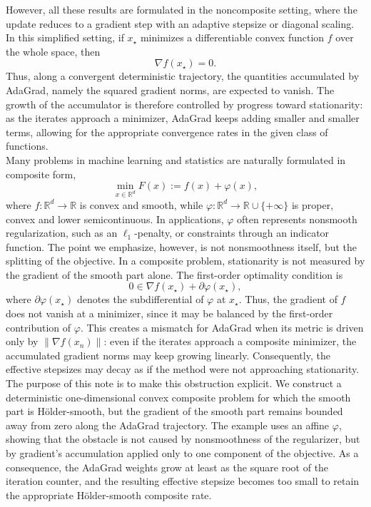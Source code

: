 \documentclass[11pt]{article}
\newcommand{\R}{\mathbb{R}}
\begin{document}
\noindent
However, all these results are formulated in the noncomposite setting, where the update reduces to a gradient step with an adaptive stepsize or diagonal scaling.
In this simplified setting, if \(x_\star\) minimizes a differentiable convex function \(f\) over the whole space, then
\[
\nabla f(x_\star)=0.
\]
Thus, along a convergent deterministic trajectory, the quantities accumulated by AdaGrad, namely the squared gradient norms, are expected to vanish. The growth of the accumulator is therefore controlled by progress toward stationarity: as the iterates approach a minimizer, AdaGrad keeps adding smaller and smaller terms, allowing for the appropriate convergence rates in the given class of functions.  \\

\noindent
Many problems in machine learning and statistics are naturally formulated in composite form,
\begin{equation}
    \min_{x\in\R^d} F(x) := f(x)+\varphi(x),
\label{eq:composite-problem}
\end{equation}
where \(f\colon\R^d\to\R\) is convex and smooth, while \(\varphi\colon\R^d\to\R\cup\{+\infty\}\) is proper, convex and lower semicontinuous. In applications, \(\varphi\) often represents nonsmooth regularization, such as an \(\ell_1\)-penalty, or constraints through an indicator function. The point we emphasize, however, is not nonsmoothness itself, but the splitting of the objective. In a composite problem, stationarity is not measured by the gradient of the smooth part alone. The first-order optimality condition is
\[
0\in \nabla f(x_\star)+\partial\varphi(x_\star),
\]
where \(\partial\varphi(x_\star)\) denotes the subdifferential of \(\varphi\) at \(x_\star\). Thus, the gradient of $f$ does not vanish at a minimizer, since it may be balanced by the first-order contribution of \(\varphi\). This creates a mismatch for AdaGrad when its metric is driven only by \(\lVert\nabla f(x_n)\rVert\): even if the iterates approach a composite minimizer, the accumulated gradient norms may keep growing linearly. Consequently, the effective stepsizes may decay as if the method were not approaching stationarity. \\

\noindent
The purpose of this note is to make this obstruction explicit. We construct a deterministic one-dimensional convex composite problem for which the smooth part is H\"older-smooth, but the gradient of the smooth part remains bounded away from zero along the AdaGrad trajectory. The example uses an affine \(\varphi\), showing that the obstacle is not caused by nonsmoothness of the regularizer, but by gradient's accumulation applied only to one component of the objective. As a consequence, the AdaGrad weights grow at least as the square root of the iteration counter, and the resulting effective stepsize becomes too small to retain the appropriate H\"older-smooth composite rate. \\ [-1ex]
\end{document}
